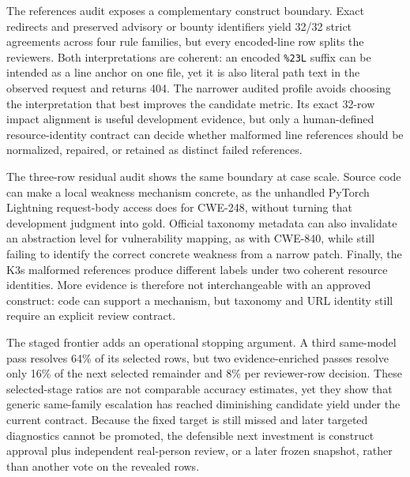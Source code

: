 The references audit exposes a complementary construct boundary. Exact redirects and preserved advisory or bounty identifiers yield 32/32 strict agreements across four rule families, but every encoded-line row splits the reviewers. Both interpretations are coherent: an encoded \texttt{\%23L} suffix can be intended as a line anchor on one file, yet it is also literal path text in the observed request and returns 404. The narrower audited profile avoids choosing the interpretation that best improves the candidate metric. Its exact 32-row impact alignment is useful development evidence, but only a human-defined resource-identity contract can decide whether malformed line references should be normalized, repaired, or retained as distinct failed references.

The three-row residual audit shows the same boundary at case scale. Source code can make a local weakness mechanism concrete, as the unhandled PyTorch Lightning request-body access does for CWE-248, without turning that development judgment into gold. Official taxonomy metadata can also invalidate an abstraction level for vulnerability mapping, as with CWE-840, while still failing to identify the correct concrete weakness from a narrow patch. Finally, the K3s malformed references produce different labels under two coherent resource identities. More evidence is therefore not interchangeable with an approved construct: code can support a mechanism, but taxonomy and URL identity still require an explicit review contract.

The staged frontier adds an operational stopping argument. A third same-model pass resolves 64\% of its selected rows, but two evidence-enriched passes resolve only 16\% of the next selected remainder and 8\% per reviewer-row decision. These selected-stage ratios are not comparable accuracy estimates, yet they show that generic same-family escalation has reached diminishing candidate yield under the current contract. Because the fixed target is still missed and later targeted diagnostics cannot be promoted, the defensible next investment is construct approval plus independent real-person review, or a later frozen snapshot, rather than another vote on the revealed rows.


